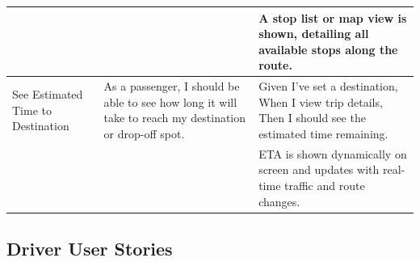\documentclass[a4paper,12pt]{article}
\begin{document}
\begin{longtable}{>{\raggedright}p{4cm} p{6cm} p{5cm}}
& & A stop list or map view is shown, detailing all available stops along the route. \\ \midrule
See Estimated Time to Destination & As a passenger, I should be able to see how long it will take to reach my destination or drop-off spot. & Given I’ve set a destination, When I view trip details, Then I should see the estimated time remaining. \\
& & ETA is shown dynamically on screen and updates with real-time traffic and route changes. \\
\bottomrule
\end{longtable}


\subsection{Driver User Stories}
\end{document}
